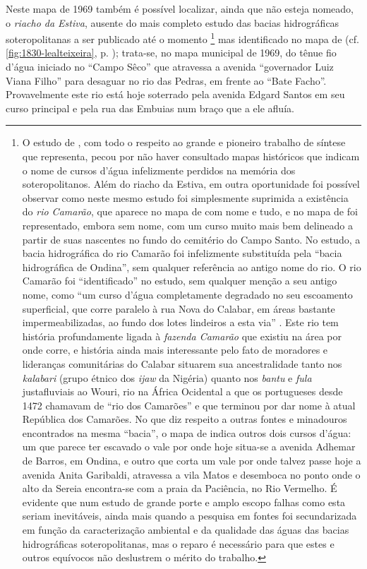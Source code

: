 Neste mapa de 1969 também é possível localizar, ainda que não esteja nomeado, o \textit{riacho da Estiva}, ausente do mais completo estudo das bacias hidrográficas soteropolitanas a ser publicado até o momento \cite{santos_aguas_2010}\footnote{O estudo de , com todo o respeito ao grande e pioneiro trabalho de síntese que representa, pecou por não haver consultado mapas históricos que indicam o nome de cursos d'água infelizmente perdidos na memória dos soteropolitanos. Além do riacho da Estiva, em outra oportunidade foi possível observar como neste mesmo estudo foi simplesmente suprimida a existência do \textit{rio Camarão}, que aparece no mapa de  com nome e tudo, e no mapa de  foi representado, embora sem nome, com um curso muito mais bem delineado a partir de suas nascentes no fundo do cemitério do Campo Santo. No estudo, a bacia hidrográfica do rio Camarão foi infelizmente substituída pela ``bacia hidrográfica de Ondina'', sem qualquer referência ao antigo nome do rio. O rio Camarão foi ``identificado'' no estudo, sem qualquer menção a seu antigo nome, como ``um curso d’água completamente degradado no seu escoamento superficial, que corre paralelo à rua Nova do Calabar, em áreas bastante impermeabilizadas, ao fundo dos lotes lindeiros a esta via'' . Este rio tem história profundamente ligada à \textit{fazenda Camarão} que existiu na área por onde corre, e história ainda mais interessante pelo fato de moradores e lideranças comunitárias do Calabar situarem sua ancestralidade tanto nos \textit{kalabari} (grupo étnico dos \textit{ijaw} da Nigéria) quanto nos \textit{bantu} e \textit{fula} justafluviais ao Wouri, rio na África Ocidental a que os portugueses desde 1472 chamavam de ``rio dos Camarões'' e que terminou por dar nome à atual República dos Camarões. No que diz respeito a outras fontes e minadouros encontrados na mesma ``bacia'', o mapa de  indica outros dois cursos d'água: um que parece ter escavado o vale por onde hoje situa-se a avenida Adhemar de Barros, em Ondina, e outro que corta um vale por onde talvez passe hoje a avenida Anita Garibaldi, atravessa a vila Matos e desemboca no ponto onde o alto da Sereia encontra-se com a praia da Paciência, no Rio Vermelho. É evidente que num estudo de grande porte e amplo escopo falhas como esta seriam inevitáveis, ainda mais quando a pesquisa em fontes foi secundarizada em função da caracterização ambiental e da qualidade das águas das bacias hidrográficas soteropolitanas, mas o reparo é necessário para que estes e outros equívocos não deslustrem o mérito do trabalho.} mas identificado no mapa de  (cf. \autoref{fig:1830-lealteixeira}, p. \pageref{fig:1830-lealteixeira}); trata-se, no mapa municipal de 1969, do tênue fio d'água iniciado no ``Campo Sêco'' que atravessa a avenida ``governador Luiz Viana Filho'' para desaguar no rio das Pedras, em frente ao ``Bate Facho''. Provavelmente este rio está hoje soterrado pela avenida Edgard Santos em seu curso principal e pela rua das Embuias num braço que a ele afluía.

